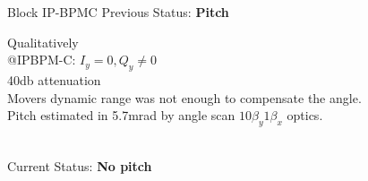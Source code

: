 \documentclass[a4paper,11pt]{book}
\begin{document}
Block IP-BPMC
Previous Status: \textbf{Pitch}\\
\begin{minipage}{0.5\textwidth}
\end{minipage}\hfill\hspace*{-2cm}\vspace*{2cm}
\begin{minipage}{0.5\textwidth}
Qualitatively\\
@IPBPM-C: $I_y=0, Q_y\neq0$\\
40db attenuation\\
Movers dynamic range was not enough to compensate the angle.\\
Pitch estimated in 5.7mrad by angle scan $10\beta_y1\beta_x$ optics.
\end{minipage}\\
\vspace*{-2.0cm}
Current Status: \textbf{No pitch}\\
\end{document}
